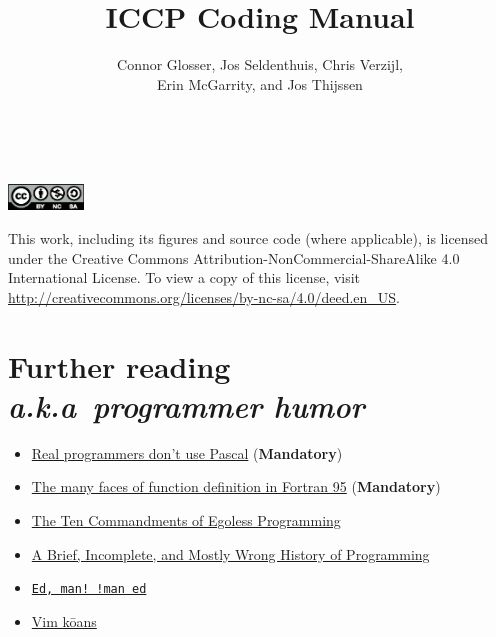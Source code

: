 \documentclass[nofonts, notoc, debug]{tufte-book}
\title{ICCP Coding Manual}
\author{Connor Glosser, Jos Seldenthuis, Chris Verzijl, \\ 
  Erin McGarrity, and Jos Thijssen}
\newcommand{\Chapter}[2]{\chapter[#1]{#1\\[-1.5ex]\Large\itshape#2}}
\begin{document}
\maketitle

\pagestyle{empty}

\newpage\
\null\
\vfill
\begin{center}
  \includegraphics[width=0.15\textwidth]{figures/by-nc-sa.eps}
\end{center}
This work, including its figures and source code (where applicable), is
licensed under the Creative Commons Attribution-NonCommercial-ShareAlike 4.0
International License.  To view a copy of this license, visit
\url{http://creativecommons.org/licenses/by-nc-sa/4.0/deed.en_US}.

\pagestyle{fancy}

\tableofcontents


\mainmatter











\backmatter
\Chapter{Further reading}{a.k.a\ programmer humor}
\begin{itemize}
  \item \href{http://www.pbm.com/~lindahl/real.programmers.html}{Real programmers don't use Pascal} (\textbf{Mandatory})
  \item \href{https://gist.github.com/alanbriolat/3135713#file-fortran_hell-f95}{The many faces of function definition in Fortran 95} (\textbf{Mandatory})
  \item \href{http://www.codinghorror.com/blog/2006/05/the-ten-commandments-of-egoless-programming.html}{The Ten Commandments of Egoless Programming}
  \item \href{http://james-iry.blogspot.com/2009/05/brief-incomplete-and-mostly-wrong.html}{A Brief, Incomplete, and Mostly Wrong History of Programming}
  \item \href{https://www.gnu.org/fun/jokes/ed-msg.html}{\texttt{Ed, man! !man ed}}
  \item \href{http://blog.sanctum.geek.nz/vim-koans/}{Vim k\={o}ans}
\end{itemize}

\printindex
\end{document}
